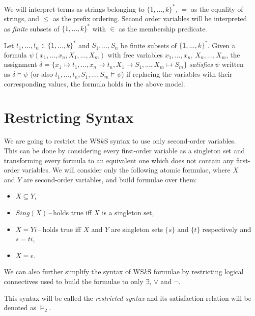We will interpret terms as strings belonging to $\{1,\ldots,k\}^*$, $=$ as the
equality of strings, and $\leq$ as the prefix ordering. Second order variables
will be interpreted as \emph{finite} subsets of $\{1,\ldots,k\}^*$ with
$\in$ as the membership predicate.
	
Let $t_1,\ldots,t_n \in \{1,\ldots,k\}^*$ and $S_1,\ldots,S_n$ be finite subsets
of $\{1,\ldots,k\}^*$. Given a formula $\psi(x_1,\ldots,x_n,X_1,\ldots,X_m)$
with free variables $x_1,\ldots,x_n$, $X_n,\ldots,X_m$, the assignment $\delta =
\{ x_1 \mapsto t_1,\ldots, x_n \mapsto t_n, X_1 \mapsto S_1,\ldots, X_m \mapsto
S_m\}$ \emph{satisfies} $\psi$ written as $\delta \models \psi$ (or also
$t_1,\ldots, t_n, S_1,\ldots,S_m \models \psi$) if replacing the variables with
their corresponding values, the formula holds in the above model.
	
  \section{Restricting Syntax}\label{restricted}
	We are going to restrict the WS$k$S syntax to use only second-order variables.
	This can be done by considering every first-order variable as a singleton set
	and transforming every formula to an equivalent one which does not contain any
	first-order variables. We will consider only the following atomic formulae,
	where $X$ and $Y$ are second-order variables, and build formulae over them:
	\begin{itemize}
	 \item $X \subseteq Y$,
\item $\mathit{Sing}(X)$\,--\,holds true iff $X$ is a singleton set, \item $X
= Yi$\,--\,holds true iff $X$ and $Y$ are singleton sets $\{s\}$ and $\{t\}$
respectively and $s = ti$,
	 \item $X = \epsilon$.
	\end{itemize}
	
We can also further simplify the syntax of WS$k$S formulae by restricting
logical connectives used to build the formulae to only $\exists$, $\vee$ and
$\neg$.
	
	 This syntax will be called
the \emph{restricted syntax} and its satisfaction relation will be denoted as
$\models_2$.
	
